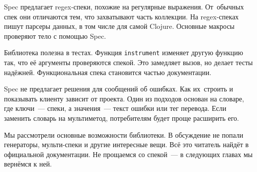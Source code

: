 Spec предлагает regex-спеки, похожие на регулярные выражения. От~обычных спек
они отличаются тем, что захватывают часть коллекции. На regex-спеках пишут
парсеры данных, в том числе для самой Clojure. Основные макросы проверяют тело с
помощью Spec.

Библиотека полезна в тестах. Функция \verb|instrument| изменяет другую функцию
так, что её аргументы проверяются спекой. Это замедляет вызов, но делает тесты
надёжней. Функциональная спека становится частью документации.

Spec не предлагает решения для сообщений об ошибках. Как их~строить и показывать
клиенту зависит от проекта. Один из подходов основан на словаре, где ключи~---
спеки, а значения~--- текст ошибки или тег перевода. Если заменить словарь на
мультиметод, потребителям будет проще расширить его.

Мы рассмотрели основные возможности библиотеки. В обсуждение не попали
генераторы, мульти-спеки и другие интересные вещи. Всё это читатель найдёт в
официальной документации. Не прощаемся со спекой~--- в следующих главах мы
вернёмся к ней.
